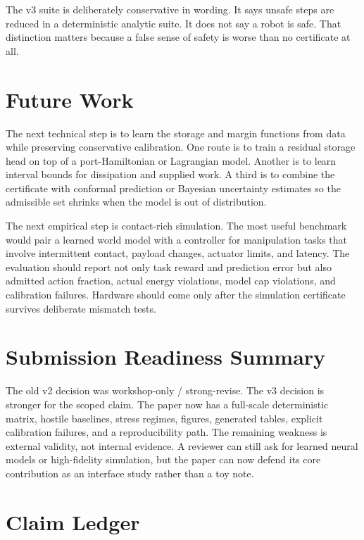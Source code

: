\documentclass{article}
\begin{document}
The v3 suite is deliberately conservative in wording. It says unsafe steps are reduced in a deterministic analytic suite. It does not say a robot is safe. That distinction matters because a false sense of safety is worse than no certificate at all.

\section{Future Work}

The next technical step is to learn the storage and margin functions from data while preserving conservative calibration. One route is to train a residual storage head on top of a port-Hamiltonian or Lagrangian model. Another is to learn interval bounds for dissipation and supplied work. A third is to combine the certificate with conformal prediction or Bayesian uncertainty estimates so the admissible set shrinks when the model is out of distribution.

The next empirical step is contact-rich simulation. The most useful benchmark would pair a learned world model with a controller for manipulation tasks that involve intermittent contact, payload changes, actuator limits, and latency. The evaluation should report not only task reward and prediction error but also admitted action fraction, actual energy violations, model cap violations, and calibration failures. Hardware should come only after the simulation certificate survives deliberate mismatch tests.

\section{Submission Readiness Summary}

The old v2 decision was workshop-only / strong-revise. The v3 decision is stronger for the scoped claim. The paper now has a full-scale deterministic matrix, hostile baselines, stress regimes, figures, generated tables, explicit calibration failures, and a reproducibility path. The remaining weakness is external validity, not internal evidence. A reviewer can still ask for learned neural models or high-fidelity simulation, but the paper can now defend its core contribution as an interface study rather than a toy note.

\clearpage
\section{Claim Ledger}
\end{document}
